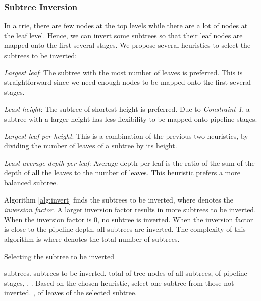 \documentclass{sigcomm-alternate}
\begin{document}
\subsubsection{Subtree Inversion}
\label{sec:invert}

In a trie, there are few nodes at the top levels while there are a lot of nodes at the leaf level. Hence, we can invert some subtrees so that their leaf nodes are mapped onto the first several stages. We propose several heuristics to select the subtrees to be inverted: 
\begin{compactenum}
	\item \textit{Largest leaf}: The subtree with the most number of leaves is preferred. This is straightforward since we need enough nodes to be mapped onto the first several stages.
	\item \textit{Least height}: The subtree of shortest height is preferred. Due to \textit{Constraint 1}, a subtree with a larger height has less flexibility to be mapped onto pipeline stages.
	\item \textit{Largest leaf per height}: This is a combination of the previous two heuristics, by dividing the number of leaves of a subtree by its height.
	\item \textit{Least average depth per leaf}: Average depth per leaf is the ratio of the sum of the depth of all the leaves to the number of leaves. This heuristic prefers a more balanced subtree. \end{compactenum}

Algorithm \ref{alg:invert} finds the subtrees to be inverted, where  denotes the \textit{inversion factor}. A larger inversion factor results in more subtrees to be inverted. When the inversion factor is 0, no subtree is inverted. When the inversion factor is close to the pipeline depth, all subtrees are inverted. The complexity of this algorithm is  where  denotes the total number of subtrees.

\begin{algorithm}[htb]
\caption{Selecting the subtree to be inverted}
\label{alg:invert}
\begin{algorithmic}[1]
\REQUIRE  subtrees.
\ENSURE  subtrees to be inverted.
\STATE  total  of tree nodes of all subtrees,  of pipeline stages, , .
\STATE Based on the chosen heuristic, select one subtree from those not inverted.
\STATE ,  of leaves of the selected subtree.
\ENDWHILE
\end{algorithmic}
\end{algorithm}
\end{document}
